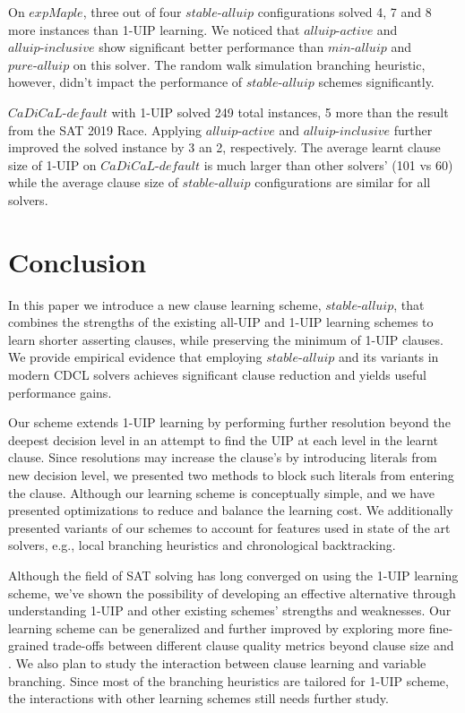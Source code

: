 \documentclass[runningheads]{llncs}
\newcommand{\oneuip}{1-UIP\xspace}
\newcommand{\alluip}{all-UIP\xspace}
\newcommand{\LBD}{\text{LBD}\xspace}
\newcommand{\stablealluip}{\textit{stable-alluip}\xspace}
\newcommand{\allUipPure}{\textit{pure-alluip}\xspace}
\newcommand{\allUipMin}{\textit{min-alluip}\xspace}
\newcommand{\allUipAct}{\textit{alluip-active}}
\newcommand{\allUipIn}{\textit{alluip-inclusive}}
\newcommand{\expSATShort}{\textit{expMaple} }
\newcommand{\defaultcadical}{\textit{CaDiCaL-default}}
\begin{document}
On $\expSATShort$, three out of four $\stablealluip$ configurations solved
4, 7 and 8 more instances than \oneuip learning. We noticed that
$\allUipAct$ and $\allUipIn$ show significant better performance than
$\allUipMin$ and $\allUipPure$ on this solver. The random walk
simulation branching heuristic, however, didn't impact the performance
of $\stablealluip$ schemes significantly.

$\defaultcadical$ with \oneuip solved 249 total instances, 5 more than the result from the SAT 2019 Race.  Applying $\allUipAct$ and $\allUipIn$ further improved the solved instance by 3 an 2, respectively.  The average learnt clause size of \oneuip on $\defaultcadical$ is much larger than other solvers' (101 vs 60) while the average clause size of $\stablealluip$ configurations are similar for all solvers.

\section{Conclusion}
In this paper we introduce a new clause learning scheme, $\stablealluip$,
that combines the strengths of the existing \alluip and \oneuip learning
schemes to learn shorter asserting clauses, while preserving the
minimum \LBD of \oneuip clauses. We provide empirical evidence that
employing $\stablealluip$ and its variants in modern CDCL solvers achieves
significant clause reduction and yields useful performance gains.

Our scheme extends \oneuip learning by performing further resolution
beyond the deepest decision level in an attempt to find the UIP at
each level in the learnt clause. Since resolutions may increase the
clause's \LBD by introducing literals from new decision level, we
presented two methods to block such literals from entering the
clause. Although our learning scheme is conceptually simple, and we
have presented optimizations to reduce and balance the learning
cost. We additionally presented variants of our schemes to account for
features used in state of the art solvers, e.g., local branching
heuristics and chronological backtracking.

Although the field of SAT solving has long converged on using the
\oneuip learning scheme, we've shown the possibility of developing an
effective alternative through understanding \oneuip and other existing
schemes' strengths and weaknesses.  Our learning scheme can be
generalized and further improved by exploring more fine-grained
trade-offs between different clause quality metrics beyond clause size
and \LBD. We also plan to study the interaction between clause learning
and variable branching. Since most of the branching heuristics are
tailored for \oneuip scheme, the interactions with other learning
schemes still needs further study.

{}

\end{document}
